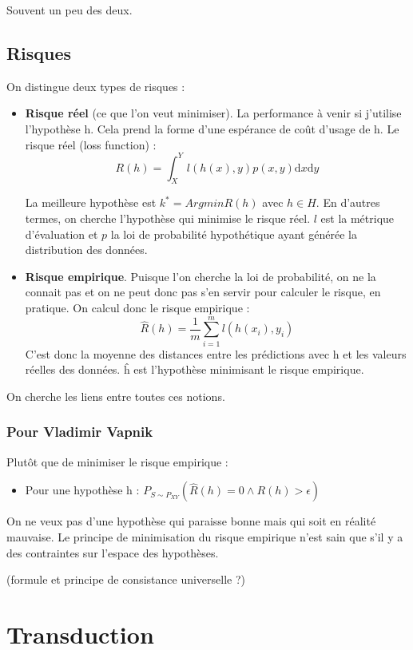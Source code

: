 \documentclass{article}
\begin{document}
Souvent un peu des deux.

\subsection{Risques}

On distingue deux types de risques :

\begin{itemize}
\item \textbf{Risque réel} (ce que l'on veut minimiser). La performance à venir si j'utilise l'hypothèse h. Cela prend la forme d'une espérance de coût d'usage de h. Le risque réel (loss function) : 
\[ R(h) = \displaystyle \int_X^Y l(h(x), y) p(x, y) \mathrm{d}x \mathrm{d}y \]

La meilleure hypothèse est $k^* = Argmin R(h)$ avec $h \in H$. En d'autres termes, on cherche l'hypothèse qui minimise le risque réel. $l$ est la métrique d'évaluation et $p$ la loi de probabilité hypothétique ayant générée la distribution des données.
\item \textbf{Risque empirique}. Puisque l'on cherche la loi de probabilité, on ne la connait pas et on ne peut donc pas s'en servir pour calculer le risque, en pratique. On calcul donc le risque empirique : 
\[ \hat{R}(h) = \frac{1}{m} \sum_{i=1}^m l(h(x_i), y_i) \]
C'est donc la moyenne des distances entre les prédictions avec h et les valeurs réelles des données. \^h est l'hypothèse minimisant le risque empirique. 
\end{itemize}

On cherche les liens entre toutes ces notions.

\subsubsection*{Pour Vladimir Vapnik}

Plutôt que de minimiser le risque empirique : 
\begin{itemize}
\item Pour une hypothèse h : $ P_{S \sim P_{XY}} (\hat{R}(h) = 0 \wedge R(h) > \epsilon ) $
\end{itemize}
On ne veux pas d'une hypothèse qui paraisse bonne mais qui soit en réalité mauvaise. Le principe de minimisation du risque empirique n'est sain que s'il y a des contraintes sur l'espace des hypothèses.

(formule et principe de consistance universelle ?)

\section{Transduction}
\end{document}
